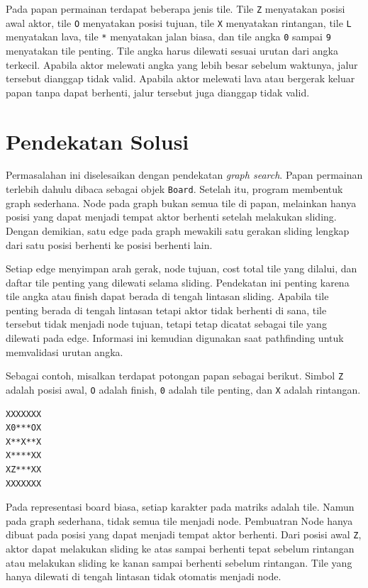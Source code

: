 \documentclass[a4paper,11pt]{article}
\begin{document}
Pada papan permainan terdapat beberapa jenis tile. Tile \texttt{Z} menyatakan posisi awal aktor, tile \texttt{O} menyatakan posisi tujuan, tile \texttt{X} menyatakan rintangan, tile \texttt{L} menyatakan lava, tile \texttt{*} menyatakan jalan biasa, dan tile angka \texttt{0} sampai \texttt{9} menyatakan tile penting. Tile angka harus dilewati sesuai urutan dari angka terkecil. Apabila aktor melewati angka yang lebih besar sebelum waktunya, jalur tersebut dianggap tidak valid. Apabila aktor melewati lava atau bergerak keluar papan tanpa dapat berhenti, jalur tersebut juga dianggap tidak valid.

\section{Pendekatan Solusi}
Permasalahan ini diselesaikan dengan pendekatan \textit{graph search}. Papan permainan terlebih dahulu dibaca sebagai objek \texttt{Board}. Setelah itu, program membentuk graph sederhana. Node pada graph bukan semua tile di papan, melainkan hanya posisi yang dapat menjadi tempat aktor berhenti setelah melakukan sliding. Dengan demikian, satu edge pada graph mewakili satu gerakan sliding lengkap dari satu posisi berhenti ke posisi berhenti lain.

Setiap edge menyimpan arah gerak, node tujuan, cost total tile yang dilalui, dan daftar tile penting yang dilewati selama sliding. Pendekatan ini penting karena tile angka atau finish dapat berada di tengah lintasan sliding. Apabila tile penting berada di tengah lintasan tetapi aktor tidak berhenti di sana, tile tersebut tidak menjadi node tujuan, tetapi tetap dicatat sebagai tile yang dilewati pada edge. Informasi ini kemudian digunakan saat pathfinding untuk memvalidasi urutan angka.

Sebagai contoh, misalkan terdapat potongan papan sebagai berikut. Simbol \texttt{Z} adalah posisi awal, \texttt{O} adalah finish, \texttt{0} adalah tile penting, dan \texttt{X} adalah rintangan.

\begin{lstlisting}[caption=Contoh Board Sederhana]
XXXXXXX
X0***OX
X**X**X
X****XX
XZ***XX
XXXXXXX
\end{lstlisting}

Pada representasi board biasa, setiap karakter pada matriks adalah tile. Namun pada graph sederhana, tidak semua tile menjadi node. Pembuatran Node hanya dibuat pada posisi yang dapat menjadi tempat aktor berhenti. Dari posisi awal \texttt{Z}, aktor dapat melakukan sliding ke atas sampai berhenti tepat sebelum rintangan atau melakukan sliding ke kanan sampai berhenti sebelum rintangan. Tile yang hanya dilewati di tengah lintasan tidak otomatis menjadi node.
\end{document}
